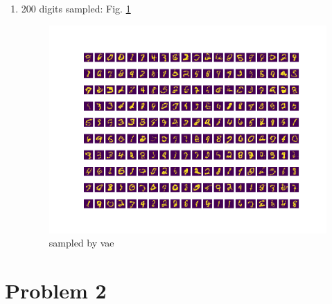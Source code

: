 \documentclass[12pt]{article}
\begin{document}
\begin{enumerate}
\item 200 digits sampled: Fig. \ref{fig:vae}
\begin{figure}
	\advance\leftskip-4cm
	\includegraphics[scale=1.5]{vae.png}
	\caption{sampled by vae}

	\label{fig:vae}
\end{figure}
\end{enumerate}

\section*{Problem 2}
\end{document}
